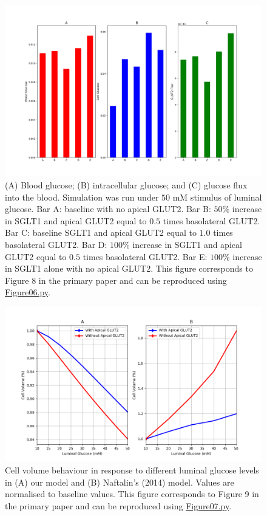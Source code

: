 \documentclass[fleqn,10pt]{physiome}
\begin{document}
\begin{figure}[htb]
\centering
\includegraphics[width=0.9\linewidth]{Figure06}
\caption{(A) Blood glucose; (B) intracellular glucose; and (C) glucose flux into the blood. Simulation was run under $50$ mM stimulus of luminal glucose. Bar A: baseline with no apical GLUT2. Bar B: $50$\% increase in SGLT1 and apical GLUT2 equal to $0.5$ times basolateral GLUT2. Bar C: baseline SGLT1 and apical GLUT2 equal to $1.0$ times basolateral GLUT2. Bar D: $100$\% increase in SGLT1 and apical GLUT2 equal to $0.5$ times basolateral GLUT2. Bar E: $100$\% increase in SGLT1 alone with no apical GLUT2. This figure corresponds to Figure 8 in the primary paper and can be reproduced using \href{https://models.physiomeproject.org/workspace/840/rawfile/bc7a5ac43ddbd15d234e66d8cb17df8388d80064/Figure06.py}{Figure06.py}.}
\label{Figure6}
\end{figure}

\begin{figure}[htb]
\centering
\includegraphics[width=0.9\linewidth]{Figure07}
\caption{Cell volume behaviour in response to different luminal glucose levels in (A) our model and (B) Naftalin's (2014) model. Values are normalised to baseline values. This figure corresponds to Figure 9 in the primary paper and can be reproduced using \href{https://models.physiomeproject.org/workspace/840/rawfile/bc7a5ac43ddbd15d234e66d8cb17df8388d80064/Figure07.py}{Figure07.py}.}
\label{Figure7}
\end{figure}
\end{document}
